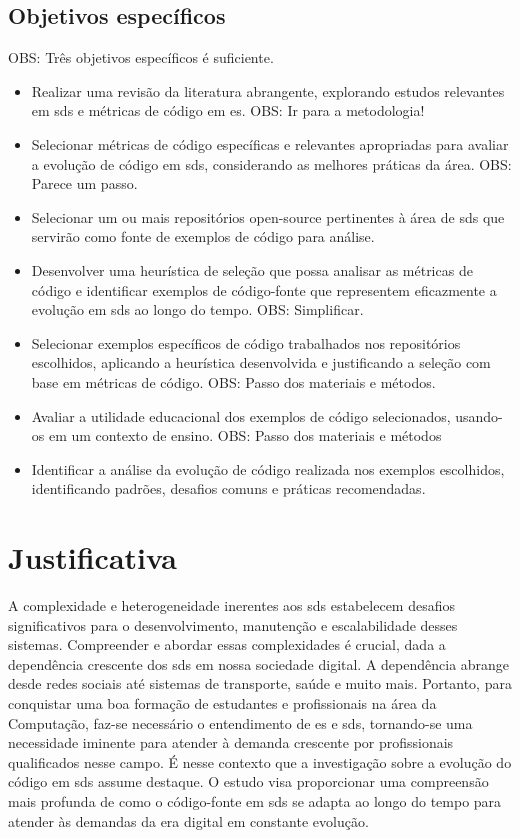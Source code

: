 \subsection{Objetivos específicos}\label{subsec:objetivosEspecificos}
OBS: Três objetivos específicos é suficiente.
\begin{itemize}
    \item Realizar uma revisão da literatura abrangente, explorando estudos relevantes em \gls{sds} e métricas de código em \gls{es}. OBS: Ir para a metodologia!
    \item Selecionar métricas de código específicas e relevantes apropriadas para avaliar a evolução de código em \gls{sds}, considerando as melhores práticas da área. OBS: Parece um passo.
    \item Selecionar um ou mais repositórios open-source pertinentes à área de \gls{sds} que servirão como fonte de exemplos de código para análise.
    \item Desenvolver uma heurística de seleção que possa analisar as métricas de código e identificar exemplos de código-fonte que representem eficazmente a evolução em \gls{sds} ao longo do tempo. OBS: Simplificar.
    \item Selecionar exemplos específicos de código trabalhados nos repositórios escolhidos, aplicando a heurística desenvolvida e justificando a seleção com base em métricas de código. OBS: Passo dos materiais e métodos.
    \item Avaliar a utilidade educacional dos exemplos de código selecionados, usando-os em um contexto de ensino. OBS: Passo dos materiais e métodos
    \item Identificar a análise da evolução de código realizada nos exemplos escolhidos, identificando padrões, desafios comuns e práticas recomendadas.
\end{itemize}

\section{Justificativa}\label{sec:justificativa}
A complexidade e heterogeneidade inerentes aos \gls{sds} estabelecem desafios significativos para o desenvolvimento, manutenção e escalabilidade desses sistemas. Compreender e abordar essas complexidades é crucial, dada a dependência crescente dos \gls{sds} em nossa sociedade digital. A dependência abrange desde redes sociais até sistemas de transporte, saúde e muito mais. Portanto, para conquistar uma boa formação de estudantes e profissionais na área da Computação, faz-se necessário o entendimento de \gls{es} e \gls{sds}, tornando-se uma necessidade iminente para atender à demanda crescente por profissionais qualificados nesse campo.
É nesse contexto que a investigação sobre a evolução do código em \gls{sds} assume destaque. O estudo visa proporcionar uma compreensão mais profunda de como o código-fonte em \gls{sds} se adapta ao longo do tempo para atender às demandas da era digital em constante evolução.

